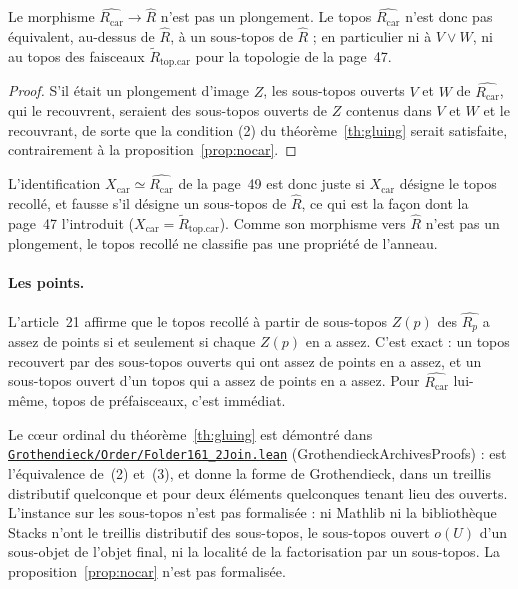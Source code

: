 \begin{corollary}
Le morphisme $\widehat{R_{\mathrm{car}}}\to\widehat R$ n'est pas un plongement. Le topos $\widehat{R_{\mathrm{car}}}$ n'est donc pas équivalent, au-dessus de $\widehat R$, à un sous-topos de $\widehat R$ ; en particulier ni à $V\vee W$, ni au topos des faisceaux $\widetilde R_{\mathrm{top.car}}$ pour la topologie  de la page~47.
\end{corollary}

\begin{proof}
S'il était un plongement d'image $Z$, les sous-topos ouverts $V$ et $W$ de $\widehat{R_{\mathrm{car}}}$, qui le recouvrent, seraient des sous-topos ouverts de $Z$ contenus dans $V$ et $W$ et le recouvrant, de sorte que la condition (2) du théorème~\ref{th:gluing} serait satisfaite, contrairement à la proposition~\ref{prop:nocar}.
\end{proof}

L'identification $X_{\mathrm{car}}\simeq\widehat{R_{\mathrm{car}}}$ de la page~49 est donc juste si $X_{\mathrm{car}}$ désigne le topos recollé, et fausse s'il désigne un sous-topos de $\widehat R$, ce qui est la façon dont la page~47 l'introduit ($X_{\mathrm{car}} = \widetilde R_{\mathrm{top.car}}$). Comme son morphisme vers $\widehat R$ n'est pas un plongement, le topos recollé ne classifie pas une propriété de l'anneau.

\paragraph{Les points.} L'article~21 affirme que le topos recollé à partir de sous-topos $Z(p)$ des $\widehat{R_p}$ a assez de points si et seulement si chaque $Z(p)$ en a assez. C'est exact : un topos recouvert par des sous-topos ouverts qui ont assez de points en a assez, et un sous-topos ouvert d'un topos qui a assez de points en a assez. Pour $\widehat{R_{\mathrm{car}}}$ lui-même, topos de préfaisceaux, c'est immédiat.

\leanentry{} Le cœur ordinal du théorème~\ref{th:gluing} est démontré dans \href{https://github.com/Commutator-IO/GrothendieckArchivesProofs/blob/main/Grothendieck/Order/Folder161_2Join.lean}{\nolinkurl{Grothendieck/Order/Folder161\_2Join.lean}} (GrothendieckArchivesProofs) :  est l'équivalence de~(2) et~(3), et  donne la forme de Grothendieck, dans un treillis distributif quelconque et pour deux éléments quelconques tenant lieu des ouverts. L'instance sur les sous-topos n'est pas formalisée : ni Mathlib ni la bibliothèque Stacks n'ont le treillis distributif des sous-topos, le sous-topos ouvert $o(U)$ d'un sous-objet de l'objet final, ni la localité de la factorisation par un sous-topos. La proposition~\ref{prop:nocar} n'est pas formalisée.

